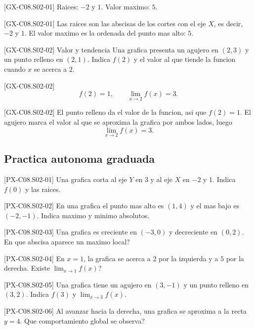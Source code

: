 \begin{shortanswer}{[GX-C08.S02-01]}
Raices: \(-2\) y \(1\). Valor maximo: \(5\).
\end{shortanswer}

\begin{fullsolution}{[GX-C08.S02-01]}
Las raices son las abscisas de los cortes con el eje \(X\), es decir, \(-2\) y \(1\). El valor
maximo es la ordenada del punto mas alto: \(5\).
\end{fullsolution}

\begin{guidedexercise}{[GX-C08.S02-02] Valor y tendencia}
Una grafica presenta un agujero en \((2,3)\) y un punto relleno en \((2,1)\). Indica \(f(2)\)
y el valor al que tiende la funcion cuando \(x\) se acerca a \(2\).
\end{guidedexercise}

\begin{shortanswer}{[GX-C08.S02-02]}
\[
f(2)=1,\qquad \lim_{x\to 2}f(x)=3.
\]
\end{shortanswer}

\begin{fullsolution}{[GX-C08.S02-02]}
El punto relleno da el valor de la funcion, asi que \(f(2)=1\). El agujero marca el valor al
que se aproxima la grafica por ambos lados, luego
\[
\lim_{x\to 2}f(x)=3.
\]
\end{fullsolution}

\subsection*{Practica autonoma graduada}
\begin{exercise}{[PX-C08.S02-01] Una grafica corta al eje \(Y\) en \(3\) y al eje \(X\) en \(-2\) y \(1\). Indica \(f(0)\) y las raices.}
\end{exercise}
\begin{exercise}{[PX-C08.S02-02] En una grafica el punto mas alto es \((1,4)\) y el mas bajo es \((-2,-1)\). Indica maximo y minimo absolutos.}
\end{exercise}
\begin{exercise}{[PX-C08.S02-03] Una grafica es creciente en \((-3,0)\) y decreciente en \((0,2)\). En que abscisa aparece un maximo local?}
\end{exercise}
\begin{exercise}{[PX-C08.S02-04] En \(x=1\), la grafica se acerca a \(2\) por la izquierda y a \(5\) por la derecha. Existe \(\lim_{x\to 1}f(x)\)?}
\end{exercise}
\begin{exercise}{[PX-C08.S02-05] Una grafica tiene un agujero en \((3,-1)\) y un punto relleno en \((3,2)\). Indica \(f(3)\) y \(\lim_{x\to 3}f(x)\).}
\end{exercise}
\begin{exercise}{[PX-C08.S02-06] Al avanzar hacia la derecha, una grafica se aproxima a la recta \(y=4\). Que comportamiento global se observa?}
\end{exercise}

